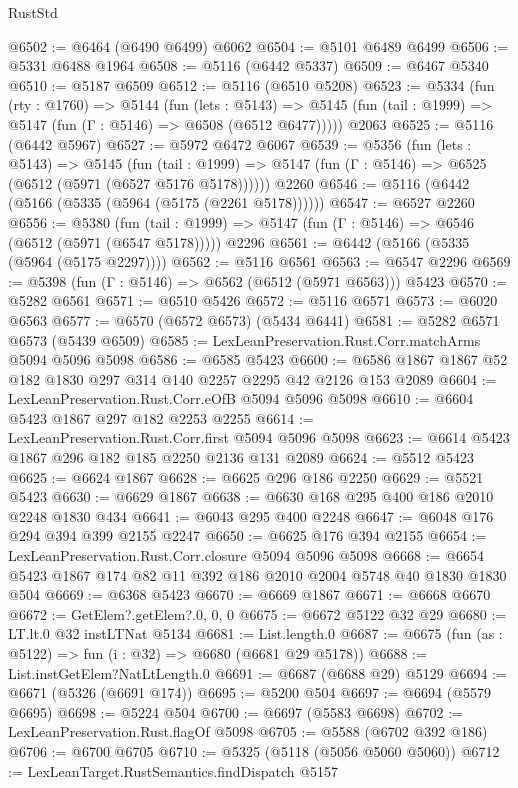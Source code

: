 \begin{lexlean}{RustStd}
\begin{coremodule}
@6502 := @6464 (@6490 @6499) @6062
@6504 := @5101 @6489 @6499
@6506 := @5331 @6488 @1964
@6508 := @5116 (@6442 @5337)
@6509 := @6467 @5340
@6510 := @5187 @6509
@6512 := @5116 (@6510 @5208)
@6523 := @5334
    (fun (rty : @1760) =>
    @5144
      (fun (lets : @5143) =>
      @5145 (fun (tail : @1999) => @5147 (fun (Γ : @5146) => @6508 (@6512 @6477)))))
    @2063
@6525 := @5116 (@6442 @5967)
@6527 := @5972 @6472 @6067
@6539 := @5356
    (fun (lets : @5143) =>
    @5145
      (fun (tail : @1999) => @5147 (fun (Γ : @5146) => @6525 (@6512 (@5971 (@6527 @5176 @5178))))))
    @2260
@6546 := @5116 (@6442 (@5166 (@5335 (@5964 (@5175 (@2261 @5178))))))
@6547 := @6527 @2260
@6556 := @5380
    (fun (tail : @1999) => @5147 (fun (Γ : @5146) => @6546 (@6512 (@5971 (@6547 @5178)))))
    @2296
@6561 := @6442 (@5166 (@5335 (@5964 (@5175 @2297))))
@6562 := @5116 @6561
@6563 := @6547 @2296
@6569 := @5398 (fun (Γ : @5146) => @6562 (@6512 (@5971 @6563))) @5423
@6570 := @5282 @6561
@6571 := @6510 @5426
@6572 := @5116 @6571
@6573 := @6020 @6563
@6577 := @6570 (@6572 @6573) (@5434 @6441)
@6581 := @5282 @6571 @6573 (@5439 @6509)
@6585 := LexLeanPreservation.Rust.Corr.matchArms @5094 @5096 @5098
@6586 := @6585 @5423
@6600 := @6586 @1867 @1867 @52 @182 @1830 @297 @314 @140 @2257 @2295 @42 @2126 @153 @2089
@6604 := LexLeanPreservation.Rust.Corr.eOfB @5094 @5096 @5098
@6610 := @6604 @5423 @1867 @297 @182 @2253 @2255
@6614 := LexLeanPreservation.Rust.Corr.first @5094 @5096 @5098
@6623 := @6614 @5423 @1867 @296 @182 @185 @2250 @2136 @131 @2089
@6624 := @5512 @5423
@6625 := @6624 @1867
@6628 := @6625 @296 @186 @2250
@6629 := @5521 @5423
@6630 := @6629 @1867
@6638 := @6630 @168 @295 @400 @186 @2010 @2248 @1830 @434
@6641 := @6043 @295 @400 @2248
@6647 := @6048 @176 @294 @394 @399 @2155 @2247
@6650 := @6625 @176 @394 @2155
@6654 := LexLeanPreservation.Rust.Corr.closure @5094 @5096 @5098
@6668 := @6654 @5423 @1867 @174 @82 @11 @392 @186 @2010 @2004 @5748 @40 @1830 @1830 @504
@6669 := @6368 @5423
@6670 := @6669 @1867
@6671 := @6668 @6670
@6672 := GetElem?.getElem?.{0, 0, 0}
@6675 := @6672 @5122 @32 @29
@6680 := LT.lt.{0} @32 instLTNat @5134
@6681 := List.length.{0}
@6687 := @6675 (fun (as : @5122) => fun (i : @32) => @6680 (@6681 @29 @5178))
@6688 := List.instGetElem?NatLtLength.{0}
@6691 := @6687 (@6688 @29) @5129
@6694 := @6671 (@5326 (@6691 @174))
@6695 := @5200 @504
@6697 := @6694 (@5579 @6695)
@6698 := @5224 @504
@6700 := @6697 (@5583 @6698)
@6702 := LexLeanPreservation.Rust.flagOf @5098
@6705 := @5588 (@6702 @392 @186)
@6706 := @6700 @6705
@6710 := @5325 (@5118 (@5056 @5060 @5060))
@6712 := LexLeanTarget.RustSemantics.findDispatch @5157

\end{coremodule}
\end{lexlean}
